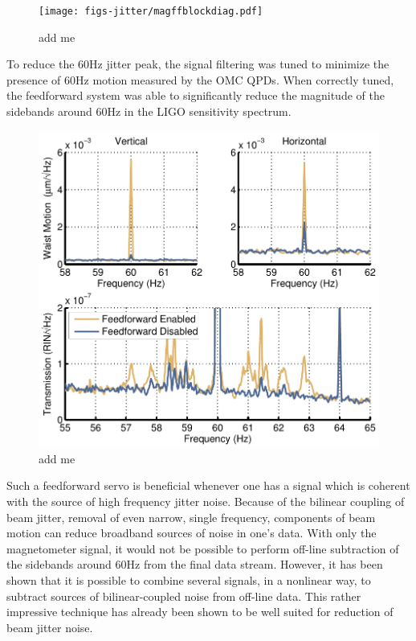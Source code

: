 \begin{figure}
  \begin{center}
  \leavevmode
  \texttt{[image: figs-jitter/magffblockdiag.pdf]}
  \end{center}
  \caption[add me]{add me}
  \label{fig:magffblockdiag}
\end{figure}

To reduce the 60Hz jitter peak, the signal filtering was tuned to minimize the presence of 60Hz motion measured by the OMC QPDs. %
When correctly tuned, the feedforward system was able to significantly reduce the magnitude of the sidebands around 60Hz in the LIGO sensitivity spectrum. %

\begin{figure}
  \begin{center}
  \leavevmode
  \includegraphics{figs-jitter/magffperformance.pdf}
  \end{center}
  \caption[add me]{add me}
  \label{fig:magffperformance}
\end{figure}

Such a feedforward servo is beneficial whenever one has a signal which is coherent with the source of high frequency jitter noise. %
Because of the bilinear coupling of beam jitter, removal of even narrow, single frequency, components of beam motion can reduce broadband sources of noise in one's data. %
With only the magnetometer signal, it would not be possible to perform off-line subtraction of the sidebands around 60Hz from the final data stream. %
However, it has been shown  that it is possible to combine several signals, in a nonlinear way, to subtract sources of bilinear-coupled noise from off-line data. This rather impressive technique has already been shown to be well suited for reduction of beam jitter noise.

